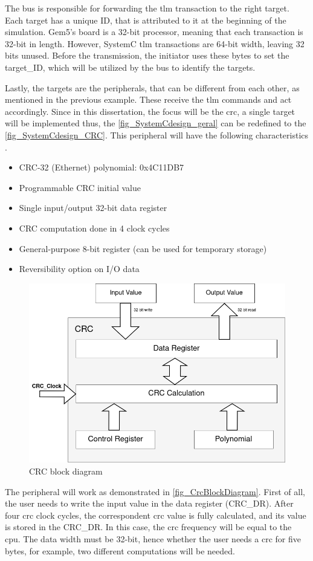 The bus is responsible for forwarding the \gls{tlm} transaction to the right target. Each target has a unique ID, that is attributed to it 
at the beginning of the simulation. Gem5's board is a 32-bit processor, meaning that each transaction is 32-bit in length. However, SystemC 
\gls{tlm} transactions are 64-bit width, leaving 32 bits unused. Before the transmission, the initiator uses these bytes to set the 
target\_ID, which will be utilized by the bus to identify the targets.

Lastly, the targets are the peripherals, that can be different from each other, as mentioned in the previous example. These receive the 
\gls{tlm} commands and act accordingly. Since in this dissertation, the focus will be the \gls{crc}, a single target will be implemented
thus, the \autoref{fig_SystemCdesign_geral} can be redefined to the \autoref{fig_SystemCdesign_CRC}. This peripheral will have the following
characteristics \cite{referenceManualRM0385}. 

\begin{itemize}
	\item CRC-32 (Ethernet) polynomial: 0x4C11DB7
	\item Programmable CRC initial value
	\item Single input/output 32-bit data register
	\item CRC computation done in 4 clock cycles 
	\item General-purpose 8-bit register (can be used for temporary storage)
	\item Reversibility option on I/O data
\end{itemize}

\begin{figure}[]
	\centering
 	\includegraphics[width=0.6\linewidth]{Images/CrcBlockDiagram.png}
 	\caption{CRC block diagram}
	 \label{fig_CrcBlockDiagram}
\end{figure}

The peripheral will work as demonstrated in \autoref{fig_CrcBlockDiagram}. First of all, the user needs to write the input value 
in the data register (CRC\_DR). After four \gls{crc} clock cycles, the correspondent \gls{crc} value is fully calculated, and its
value is stored in the CRC\_DR. In this case, the \gls{crc} frequency will be equal to the \gls{cpu}. The data width must be 32-bit, 
hence whether the user needs a \gls{crc} for five bytes, for example, two different computations will be needed. 


